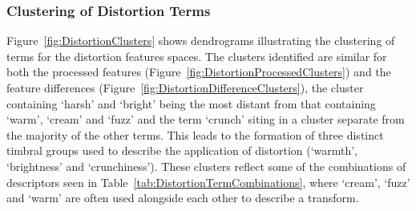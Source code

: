 		\subsubsection*{Clustering of Distortion Terms}
			Figure~\ref{fig:DistortionClusters} shows dendrograms illustrating the clustering of terms for the
			distortion features spaces. The clusters identified are similar for both the processed features
			(Figure~\ref{fig:DistortionProcessedClusters}) and the feature differences
			(Figure~\ref{fig:DistortionDifferenceClusters}), the cluster containing `harsh' and `bright' being
			the most distant from that containing `warm', `cream' and `fuzz' and the term `crunch' siting in a
			cluster separate from the majority of the other terms. This leads to the formation of three
			distinct timbral groups used to describe the application of distortion (`warmth', `brightness' and
			`crunchiness'). These clusters reflect some of the combinations of descriptors seen in
			Table~\ref{tab:DistortionTermCombinations}, where `cream', `fuzz' and `warm' are often used
			alongside each other to describe a transform.

